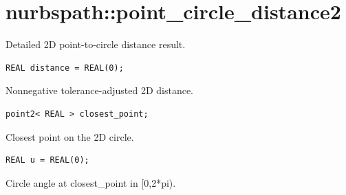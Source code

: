 \section{nurbspath::point\_circle\_distance2}
Detailed 2D point-to-circle distance result.
\par\noindent\begin{minipage}{\linewidth}
\begin{lstlisting}[style=apireference]
REAL distance = REAL(0);
\end{lstlisting}
{\footnotesize Nonnegative tolerance-adjusted 2D distance.\par}
\end{minipage}\par\vspace{1pt}
\par\noindent\begin{minipage}{\linewidth}
\begin{lstlisting}[style=apireference]
point2< REAL > closest_point;
\end{lstlisting}
{\footnotesize Closest point on the 2D circle.\par}
\end{minipage}\par\vspace{1pt}
\par\noindent\begin{minipage}{\linewidth}
\begin{lstlisting}[style=apireference]
REAL u = REAL(0);
\end{lstlisting}
{\footnotesize Circle angle at closest\_point in [0,2*pi).\par}
\end{minipage}\par\vspace{1pt}
